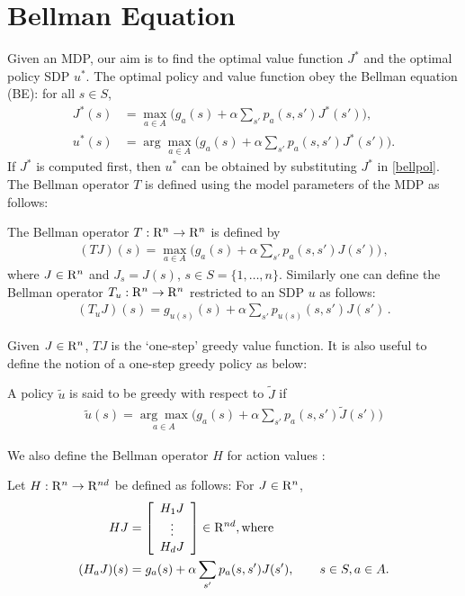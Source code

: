 \section{Bellman Equation}
Given an MDP, our aim is to find the optimal value function $J^*$ and the optimal policy SDP $u^*$. The optimal policy and value function obey the Bellman equation (BE): for all $ s \in S$,
\begin{subequations}\label{bell}
\begin{align}
\label{bellval}J^*(s)&=\max_{ a\in A}\big(g_a(s)+\alpha \sum_{s'}p_a(s,s')J^*(s')\big),\\
\label{bellpol}u^*(s)&=\arg\max_{ a\in A}\big(g_a(s)+\alpha \sum_{s'}p_a(s,s')J^*(s')\big).
\end{align}
\end{subequations}
If $J^*$ is computed first, then $u^*$ can be obtained by substituting $J^*$ in \eqref{bellpol}. The Bellman operator $T$ is defined using the model parameters of the MDP as follows:
\begin{definition}
The Bellman operator $T: \mathrm{R}^n \to \mathrm{R}^n$ is defined by 
\begin{align}
(TJ)(s)=\max_{a \in A}\big(g_a(s)+\alpha \sum_{s'} p_a(s,s')J(s')\big)\,, 
\end{align}
where $J\in \mathrm{R}^n$ and $J_s = J(s)$, $s\in S = \{1,\dots,n\}$.  
Similarly one can define the Bellman operator $T_u:\mathrm{R}^n \to \mathrm{R}^n$ restricted to an SDP $u$ as follows:
\begin{align}
(T_uJ)(s)=g_{u(s)}(s)+\alpha \sum_{s'} p_{u(s)}(s,s')J(s')\,.
\end{align}
\end{definition}
Given $J \in \mathrm{R}^n$, $TJ$ is the `one-step' greedy value function. It is also useful to define the notion of a one-step greedy policy as below:
\begin{definition}
A policy $\tilde{u}$ is said to be greedy with respect to $\tilde{J}$ if
\begin{align}\label{subpol}
\tilde{u}(s)=\underset{a \in A}{\arg\max}  \big(g_a(s)+\alpha\sum_{s'} p_a(s,s')\tilde{J}(s')\big)
\end{align}
\end{definition}
We also define the Bellman operator $H$ for action values  \cite{BertB}:
\begin{definition}\label{bellactval}
Let $H: \mathrm{R}^n \to \mathrm{R}^{nd}$ be defined as follows: For $J\in \mathrm{R}^n$,
\begin{align}
HJ&=\left[ {\begin{array}{c} H_1 J  \\ \vdots \\ H_d J\end{array}} \right]\in \mathrm{R}^{nd},\mbox{where}\nonumber\\
(H_a J)(s)&= g_a(s)+\alpha \sum_{s'}p_a(s,s') J(s'), \qquad s\in S, a\in A.
\end{align}
\end{definition}
